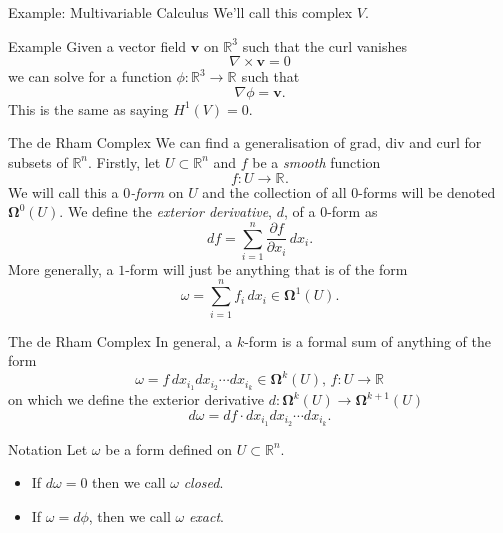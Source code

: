 \documentclass{beamer}
\newcommand{\R}[1]{\mathbb{R}^{#1}}
\newcommand{\omg}[1]{\boldsymbol{\Omega}^{#1}}
\newcommand{\pd}[2]{\frac{\partial#1}{\partial#2}}
\begin{document}
\begin{frame}{Example: Multivariable Calculus}
We'll call this complex $V$.
\begin{center}
\end{center}

\begin{exampleblock}{Example}
Given a vector field $\textbf{v}$ on $\R{3}$ such that the curl vanishes
\[
\nabla\!\times\textbf{v}=0
\]
we can solve for a function $\phi:\R{3}\to\R{}$ such that 
\[
\nabla\phi=\textbf{v}.
\]
This is the same as saying $H^{1}(V)=0$.
\end{exampleblock}
\end{frame}




\begin{frame}{The de Rham Complex}
We can find a generalisation of grad, div and curl for subsets of $\R{n}$. Firstly, let $U \subset \R{n}$ and $f$ be a \emph{smooth} function
\[
f: U \to \R{}.
\]
We will call this a \emph{$0$-form} on $U$ and the collection of all $0$-forms will be denoted $\omg{0}(U)$. We define the \emph{exterior derivative}, $d$, of a $0$-form as
\[
df = \sum\limits_{i=1}^{n} \pd{f}{x_i} \, dx_i.
\]
More generally, a $1$-form will just be anything that is of the form
\[
\omega = \sum\limits_{i=1}^{n} f_i \, dx_i \in \omg{1}(U).
\]
\end{frame}



\begin{frame}{The de Rham Complex}
In general, a $k$-form is a formal sum of anything of the form
\[
\omega = f \, dx_{i_1} dx_{i_2} \cdots dx_{i_k} \in \omg{k}(U), \, f : U \to \R{}
\]
on which we define the exterior derivative $d : \omg{k}(U) \to \omg{k+1}(U)$
\[
d\omega = df \cdot dx_{i_1} dx_{i_2} \cdots dx_{i_k}.
\]
\begin{block}{Notation}
Let $\omega$ be a form defined on $U \subset \R{n}$.
\begin{itemize}
\item If $d\omega=0$ then we call $\omega$ \emph{closed}.
\item If $\omega=d\phi$, then we call $\omega$ \emph{exact}.
\end{itemize}
\end{block}
\end{frame}
\end{document}
